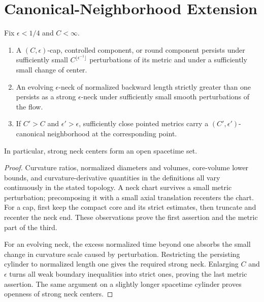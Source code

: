 \section{Canonical-Neighborhood Extension}

\begin{lemma}
\label{lem:canonical-neighborhood-stability}
\notready
Fix $\epsilon<1/4$ and $C<\infty$.
\begin{enumerate}
\item A $(C,\epsilon)$-cap, controlled component, or round component
      persists under sufficiently small
      $C^{\lfloor\epsilon^{-1}\rfloor}$ perturbations of its metric and
      under a sufficiently small change of center.
\item An evolving $\epsilon$-neck of normalized backward length strictly
      greater than one persists as a strong $\epsilon$-neck under
      sufficiently small smooth perturbations of the flow.
\item If $C'>C$ and $\epsilon'>\epsilon$, sufficiently close pointed
      metrics carry a $(C',\epsilon')$-canonical neighborhood at the
      corresponding point.
\end{enumerate}
In particular, strong neck centers form an open spacetime set.
\end{lemma}

\begin{proof}
Curvature ratios, normalized diameters and volumes, core-volume lower
bounds, and curvature-derivative quantities in the definitions all vary
continuously in the stated topology.  A neck chart survives a small metric
perturbation; precomposing it with a small axial translation recenters the
chart.  For a cap, first keep the compact core and its strict estimates,
then truncate and recenter the neck end.  These observations prove the
first assertion and the metric part of the third.

For an evolving neck, the excess normalized time beyond one absorbs the
small change in curvature scale caused by perturbation.  Restricting the
persisting cylinder to normalized length one gives the required strong
neck.  Enlarging $C$ and $\epsilon$ turns all weak boundary inequalities
into strict ones, proving the last metric assertion.  The same argument on
a slightly longer spacetime cylinder proves openness of strong neck centers.
\end{proof}

